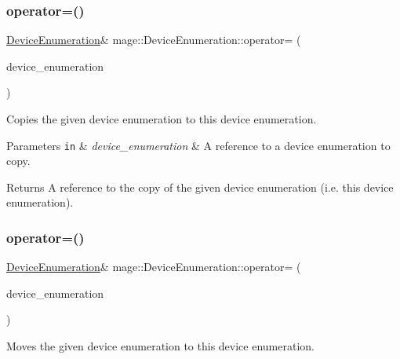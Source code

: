 \subsubsection{\texorpdfstring{operator=()}{operator=()}\hspace{0.1cm}{\footnotesize\ttfamily [1/2]}}
{\footnotesize\ttfamily \hyperlink{classmage_1_1_device_enumeration}{Device\+Enumeration}\& mage\+::\+Device\+Enumeration\+::operator= (\begin{DoxyParamCaption}\item[{const \hyperlink{classmage_1_1_device_enumeration}{Device\+Enumeration} \&}]{device\+\_\+enumeration }\end{DoxyParamCaption})\hspace{0.3cm}{\ttfamily [delete]}}

Copies the given device enumeration to this device enumeration.


\begin{DoxyParams}[1]{Parameters}
\mbox{\tt in}  & {\em device\+\_\+enumeration} & A reference to a device enumeration to copy. \\
\hline
\end{DoxyParams}
\begin{DoxyReturn}{Returns}
A reference to the copy of the given device enumeration (i.\+e. this device enumeration). 
\end{DoxyReturn}
\hypertarget{classmage_1_1_device_enumeration_accf36804bfe510cc8a4d8495854596d6}{}\label{classmage_1_1_device_enumeration_accf36804bfe510cc8a4d8495854596d6} 
\subsubsection{\texorpdfstring{operator=()}{operator=()}\hspace{0.1cm}{\footnotesize\ttfamily [2/2]}}
{\footnotesize\ttfamily \hyperlink{classmage_1_1_device_enumeration}{Device\+Enumeration}\& mage\+::\+Device\+Enumeration\+::operator= (\begin{DoxyParamCaption}\item[{\hyperlink{classmage_1_1_device_enumeration}{Device\+Enumeration} \&\&}]{device\+\_\+enumeration }\end{DoxyParamCaption})\hspace{0.3cm}{\ttfamily [delete]}}

Moves the given device enumeration to this device enumeration.


